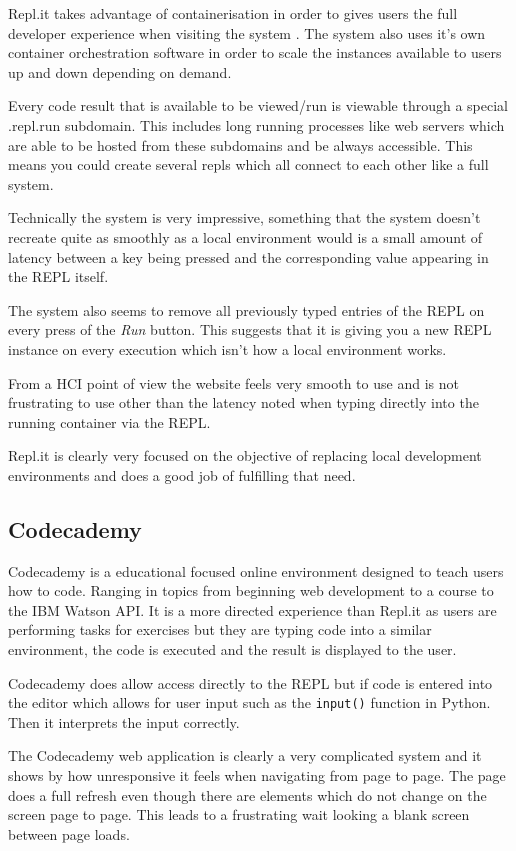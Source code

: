 Repl.it takes advantage of containerisation in order to gives users the full developer experience when visiting the system \cite{replit-containers}. The system also uses it's own container orchestration software in order to scale the instances available to users up and down depending on demand.

Every code result that is available to be viewed/run is viewable through a special .repl.run subdomain. This includes long running processes like web servers which are able to be hosted from these subdomains and be always accessible. This means you could create several repls which all connect to each other like a full system.

Technically the system is very impressive, something that the system doesn't recreate quite as smoothly as a local environment would is a small amount of latency between a key being pressed and the corresponding value appearing in the REPL itself.

The system also seems to remove all previously typed entries of the REPL on every press of the \textit{Run} button. This suggests that it is giving you a new REPL instance on every execution which isn't how a local environment works.

From a HCI point of view the website feels very smooth to use and is not frustrating to use other than the latency noted when typing directly into the running container via the REPL.

Repl.it is clearly very focused on the objective of replacing local development environments and does a good job of fulfilling that need.

\subsection{Codecademy}
Codecademy is a educational focused online environment designed to teach users how to code. Ranging in topics from beginning web development to a course to the IBM Watson API. It is a more directed experience than Repl.it as users are performing tasks for exercises but they are typing code into a similar environment, the code is executed and the result is displayed to the user.

Codecademy does allow access directly to the REPL but if code is entered into the editor which allows for user input such as the \texttt{input()} function in Python. Then it interprets the input correctly.

The Codecademy web application is clearly a very complicated system and it shows by how unresponsive it feels when navigating from page to page. The page does a full refresh even though there are elements which do not change on the screen page to page. This leads to a frustrating wait looking a blank screen between page loads.

